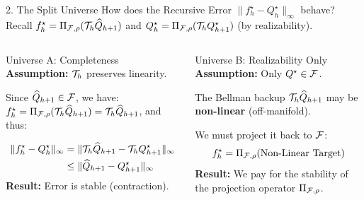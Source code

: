 \documentclass[aspectratio=169]{beamer}
\begin{document}
\begin{frame}{2. The Split Universe}
    How does the Recursive Error $\|f^\star_h - Q^\star_h\|_\infty$ behave?\\
    Recall $f^\star_h = \Pi_{\mathcal{F},\rho} (\mathcal{T}_h \widehat{Q}_{h+1})$
    and $Q^\star_h = \Pi_{\mathcal{F},\rho} (\mathcal{T}_h Q^\star_{h+1})$ (by realizability).
    
    \vspace{0.2cm}
    
    \begin{columns}[t]

        \begin{block}{Universe A: Completeness}
        \textbf{Assumption:} $\mathcal{T}_h$ preserves linearity.
        
        \vspace{0.2cm}
         Since $\widehat{Q}_{h+1} \in \mathcal{F}$, we have:
        $f^\star_h = \Pi_{\mathcal{F},\rho} (\mathcal{T}_h \widehat{Q}_{h+1}) =
        \mathcal{T}_h \widehat{Q}_{h+1}$, and thus:

        \vspace*{-0.3cm}
        \begin{align*}
        \|f^\star_h - Q^\star_h\|_\infty &=\|\mathcal{T}_h \widehat{Q}_{h+1}
        - \mathcal{T}_h Q_{h+1}^\star \|_\infty\\
          &\leq \| \widehat{Q}_{h+1} - Q_{h+1}^\star \|_\infty
        \end{align*}
        \textbf{Result:} Error is stable (contraction).
        \end{block}


        \begin{block}{Universe B: Realizability Only}
        \textbf{Assumption:} Only $Q^\star \in \mathcal{F}$.
        
        \vspace{0.2cm}
        The Bellman backup $\mathcal{T}_h \widehat{Q}_{h+1}$ may be \textbf{non-linear} (off-manifold).
        
        \vspace{0.2cm}
        We must project it back to $\mathcal{F}$:
        \[
        f^\star_h = \Pi_{\mathcal{F},\rho} (\text{Non-Linear Target})
        \]
        \textbf{Result:} We pay for the stability of the projection operator $\Pi_{\mathcal{F},\rho}$.
        \end{block}
    \end{columns}
\end{frame}
\end{document}
